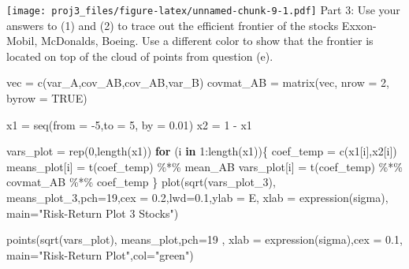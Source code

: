 \documentclass[
]{article}
\newenvironment{Shaded}{\begin{snugshade}}{\end{snugshade}}
\newcommand{\AttributeTok}[1]{\textcolor[rgb]{0.77,0.63,0.00}{#1}}
\newcommand{\ConstantTok}[1]{\textcolor[rgb]{0.00,0.00,0.00}{#1}}
\newcommand{\ControlFlowTok}[1]{\textcolor[rgb]{0.13,0.29,0.53}{\textbf{#1}}}
\newcommand{\DecValTok}[1]{\textcolor[rgb]{0.00,0.00,0.81}{#1}}
\newcommand{\FloatTok}[1]{\textcolor[rgb]{0.00,0.00,0.81}{#1}}
\newcommand{\FunctionTok}[1]{\textcolor[rgb]{0.00,0.00,0.00}{#1}}
\newcommand{\NormalTok}[1]{#1}
\newcommand{\OtherTok}[1]{\textcolor[rgb]{0.56,0.35,0.01}{#1}}
\newcommand{\SpecialCharTok}[1]{\textcolor[rgb]{0.00,0.00,0.00}{#1}}
\newcommand{\StringTok}[1]{\textcolor[rgb]{0.31,0.60,0.02}{#1}}
\begin{document}
\texttt{[image: proj3\_files/figure-latex/unnamed-chunk-9-1.pdf]} Part 3:
Use your answers to (1) and (2) to trace out the efficient frontier of
the stocks Exxon-Mobil, McDonalds, Boeing. Use a different color to show
that the frontier is located on top of the cloud of points from question
(e).

\begin{Shaded}
\begin{Highlighting}[]
\NormalTok{vec }\OtherTok{=} \FunctionTok{c}\NormalTok{(var\_A,cov\_AB,cov\_AB,var\_B)}
\NormalTok{covmat\_AB }\OtherTok{=} \FunctionTok{matrix}\NormalTok{(vec, }\AttributeTok{nrow =} \DecValTok{2}\NormalTok{, }\AttributeTok{byrow =} \ConstantTok{TRUE}\NormalTok{)}

\NormalTok{x1 }\OtherTok{=} \FunctionTok{seq}\NormalTok{(}\AttributeTok{from =} \SpecialCharTok{{-}}\DecValTok{5}\NormalTok{,}\AttributeTok{to =} \DecValTok{5}\NormalTok{, }\AttributeTok{by =} \FloatTok{0.01}\NormalTok{) }
\NormalTok{x2 }\OtherTok{=} \DecValTok{1} \SpecialCharTok{{-}}\NormalTok{ x1}

\NormalTok{vars\_plot }\OtherTok{=} \FunctionTok{rep}\NormalTok{(}\DecValTok{0}\NormalTok{,}\FunctionTok{length}\NormalTok{(x1))}
\ControlFlowTok{for}\NormalTok{ (i }\ControlFlowTok{in} \DecValTok{1}\SpecialCharTok{:}\FunctionTok{length}\NormalTok{(x1))\{}
\NormalTok{  coef\_temp }\OtherTok{=} \FunctionTok{c}\NormalTok{(x1[i],x2[i])}
\NormalTok{  means\_plot[i] }\OtherTok{=} \FunctionTok{t}\NormalTok{(coef\_temp) }\SpecialCharTok{\%*\%}\NormalTok{ mean\_AB}
\NormalTok{  vars\_plot[i] }\OtherTok{=} \FunctionTok{t}\NormalTok{(coef\_temp) }\SpecialCharTok{\%*\%}\NormalTok{ covmat\_AB }\SpecialCharTok{\%*\%}\NormalTok{ coef\_temp}
\NormalTok{\}}
\FunctionTok{plot}\NormalTok{(}\FunctionTok{sqrt}\NormalTok{(vars\_plot\_3), means\_plot\_3,}\AttributeTok{pch=}\DecValTok{19}\NormalTok{,}\AttributeTok{cex =} \FloatTok{0.2}\NormalTok{,}\AttributeTok{lwd=}\FloatTok{0.1}\NormalTok{,}\AttributeTok{ylab =} \StringTok{\textquotesingle{}E\textquotesingle{}}\NormalTok{, }\AttributeTok{xlab =} \FunctionTok{expression}\NormalTok{(sigma), }\AttributeTok{main=}\StringTok{"Risk{-}Return Plot 3 Stocks"}\NormalTok{) }

\FunctionTok{points}\NormalTok{(}\FunctionTok{sqrt}\NormalTok{(vars\_plot), means\_plot,}\AttributeTok{pch=}\DecValTok{19}\NormalTok{ , }\AttributeTok{xlab =} \FunctionTok{expression}\NormalTok{(sigma),}\AttributeTok{cex =} \FloatTok{0.1}\NormalTok{, }\AttributeTok{main=}\StringTok{"Risk{-}Return Plot"}\NormalTok{,}\AttributeTok{col=}\StringTok{"green"}\NormalTok{)}
\end{Highlighting}
\end{Shaded}
\end{document}
